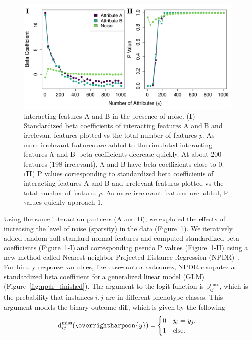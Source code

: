 \documentclass[10pt,letterpaper]{article}
\begin{document}
\begin{figure}[H]
	\centering
	\includegraphics[width=1\textwidth]{betas_and_pvals_vs_p_ABC.pdf}
	\caption{Interacting features A and B in the presence of noise. (\textbf{I}) Standardized beta coefficients of interacting features A and B and irrelevant features plotted vs the total number of features $p$. As more irrelevant features are added to the simulated interacting features A and B, beta coefficients decrease quickly. At about 200 features (198 irrelevant), A and B have beta coefficients close to 0. (\textbf{II}) P values corresponding to standardized beta coefficients of interacting features A and B and irrelevant features plotted vs the total number of features $p$. As more irrelevant features are added, P values quickly approach 1.}\label{fig:ABC_plus_noise}
\end{figure}


Using the same interaction partners (A and B), we explored the effects of increasing the level of noise (sparsity) in the data (Figure~\ref{fig:ABC_plus_noise}). We iteratively added random null standard normal features and computed standardized beta coefficients (Figure~\ref{fig:ABC_plus_noise}-I) and corresponding pseudo P values (Figure~\ref{fig:ABC_plus_noise}-II) using a new method called Nearest-neighbor Projected Distance Regression (NPDR)~\cite{npdr2}. For binary response variables, like case-control outcomes, NPDR computes a standardized beta coefficient for a generalized linear model (GLM) (Figure~\ref{fig:npdr_finished}). The argument to the logit function is $\text{p}^\text{miss}_{ij}$, which is the probability that instances $i,j$ are in different phenotype classes. This argument models the binary outcome diff, which is given by the following
%
\begin{equation}\label{eq:diff_outcome}
\text{d}^\text{miss}_{ij}(\overrightharpoon{y})=\begin{cases}
0 & y_i = y_j, \\
1 & \text{else}.
\end{cases}
\end{equation} 
\end{document}

